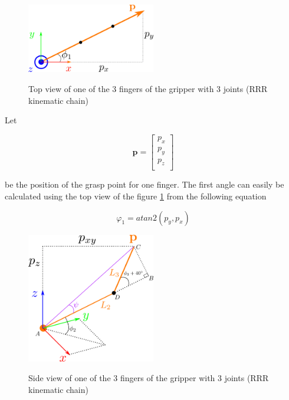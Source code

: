 \begin{center}
\begin{figure}[!htb]
\centering
\includegraphics[width=0.5\textwidth]{images/grasper-rrr-top.png}\\
\caption{Top view of one of the 3 fingers of the gripper with 3 joints (RRR kinematic chain)}
\label{grasper-rrr-top}
\end{figure}
\end{center}

Let

\[
\mathbf{p} = \begin{bmatrix} p_x \\ p_y \\ p_z \\ \end{bmatrix}
\]

be the position of the grasp point for one finger. The first angle can easily be calculated using the top view of the figure \ref{grasper-rrr-top} from the following equation

\begin{equation}
φ_1 = atan2 \left( p_y, p_x \right)
\end{equation}

\begin{center}
\begin{figure}[!htb]
\centering
\includegraphics[width=0.5\textwidth]{images/grasper-rrr-side.png}\\
\caption{Side view of one of the 3 fingers of the gripper with 3 joints (RRR kinematic chain)}
\label{grasper-rrr-side}
\end{figure}
\end{center}

